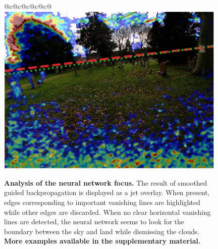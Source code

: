 \begin{figure}
\begin{tabular}{@{}c@{}c@{}c@{}c@{}c@{}}
\includegraphics[width=\sgbpwidth\linewidth]{figures/nn_analysis/sgbp/pano_addhxkomphqrlr_jpg-4.png} \\
\end{tabular}
\egroup
\def\arraystretch{0.5} %
\caption{\textbf{Analysis of the neural network focus.} The result of smoothed guided backpropagation is displayed as a jet overlay. When present, edges corresponding to important vanishing lines are highlighted while other edges are discarded. When no clear horizontal vanishing lines are detected, the neural network seems to look for the boundary between the sky and land while dismissing the clouds. \textbf{More examples available in the supplementary material.}}
\label{fig:nn_analysis_smoothed-guided-back-propagation}
\end{figure}

